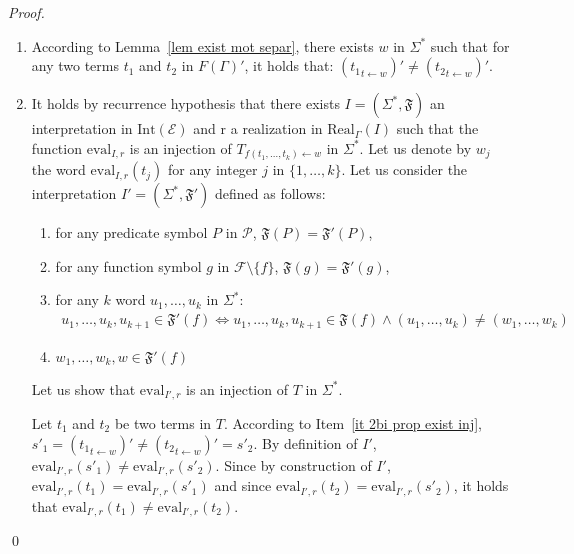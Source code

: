 \documentclass[a4paper]{llncs}
\begin{document}
\begin{proof}
\begin{enumerate}
\begin{enumerate}
    \begin{enumerate}
      \item\label{it 2bi prop exist inj} According to Lemma~\ref{lem exist mot separ}, there exists $w$ in $\Sigma^*$ such that for any two terms $t_1$ and $t_2$ in $F(\Gamma)'$, it holds that: $({t_1}_{t\leftarrow w})'\neq({t_2}_{t\leftarrow w})'$. 
        
      \item It holds by recurrence hypothesis that there exists $I=(\Sigma^*,\mathfrak{F})$ an interpretation in $\mathrm{Int}(\mathcal{E})$ and $\mathrm{r}$ a realization in $\mathrm{Real}_\Gamma(I)$ such that the function $\mathrm{eval}_{I,r}$ is an injection of $T_{f(t_1,\ldots,t_k)\leftarrow w}$ in $\Sigma^*$. 
    Let us denote by $w_j$ the word $\mathrm{eval}_{I,r}(t_j)$ for any integer $j$ in $\{1,\ldots,k\}$.
    Let us consider the interpretation $I'=(\Sigma^*,\mathfrak{F}')$ defined as follows:
    \begin{enumerate}
      \item for any predicate symbol $P$ in $\mathcal{P}$, $\mathfrak{F}(P)=\mathfrak{F}'(P)$,
      \item for any function symbol $g$ in $\mathcal{F}\setminus\{f\}$, $\mathfrak{F}(g)=\mathfrak{F}'(g)$,
      \item for any $k$ word $u_1,\ldots,u_k$ in $\Sigma^*$:
        \begin{align*}
        u_1,\ldots,u_k,u_{k+1}\in \mathfrak{F}'(f) \Leftrightarrow u_1,\ldots,u_k,u_{k+1}\in \mathfrak{F}(f)\wedge (u_1,\ldots,u_k)\neq(w_1,\ldots,w_k)
        \end{align*}    
    \item $w_1,\ldots,w_k,w\in \mathfrak{F}'(f)$
  \end{enumerate}
    
    Let us show that $\mathrm{eval}_{I',r}$ is an injection of $T$ in $\Sigma^*$. 
    
        Let $t_1$ and $t_2$ be two terms in $T$. According to Item~\ref{it 2bi prop exist inj}, $s'_1=({t_1}_{t\leftarrow w})'\neq ({t_2}_{t\leftarrow w})'=s'_2$. By definition of $I'$, $\mathrm{eval}_{I',r}(s'_1)\neq \mathrm{eval}_{I',r}(s'_2)$. Since by construction of $I'$, $\mathrm{eval}_{I',r}(t_1)= \mathrm{eval}_{I',r}(s'_1)$ and since $\mathrm{eval}_{I',r}(t_2)= \mathrm{eval}_{I',r}(s'_2)$, it holds that $\mathrm{eval}_{I',r}(t_1)\neq \mathrm{eval}_{I',r}(t_2)$.
        \end{enumerate}
        \end{enumerate}
    \end{enumerate}
    \qed
  \end{proof} 
  
\end{document}
